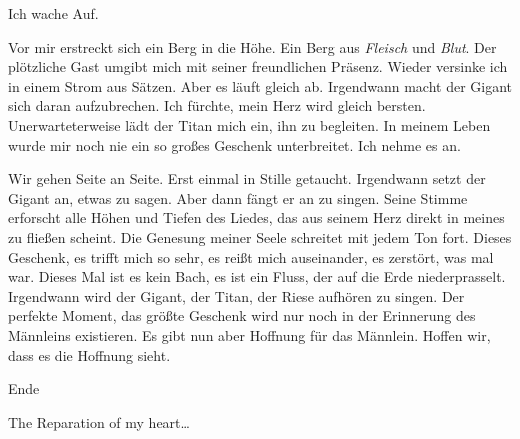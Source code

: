 \documentclass{article}
\begin{document}
	Ich wache Auf.
	
	Vor mir erstreckt sich ein Berg in die Höhe. Ein Berg aus \textit{Fleisch} und \textit{Blut}. Der plötzliche Gast umgibt mich mit seiner freundlichen Präsenz. Wieder versinke ich in einem Strom aus Sätzen. Aber es läuft gleich ab. Irgendwann macht der Gigant sich daran aufzubrechen. Ich fürchte, mein Herz wird gleich bersten. Unerwarteterweise lädt der Titan mich ein, ihn zu begleiten. In meinem Leben wurde mir noch nie ein so großes Geschenk unterbreitet. Ich nehme es an.  
	
	Wir gehen Seite an Seite. Erst einmal in Stille getaucht. Irgendwann setzt der Gigant an, etwas zu sagen. Aber dann fängt er an zu singen. Seine Stimme erforscht alle Höhen und Tiefen des Liedes, das aus seinem Herz direkt in meines zu fließen scheint. Die Genesung meiner Seele schreitet mit jedem Ton fort. Dieses Geschenk, es trifft mich so sehr, es reißt mich auseinander, es zerstört, was mal war. Dieses Mal ist es kein Bach, es ist ein Fluss, der auf die Erde niederprasselt. Irgendwann wird der Gigant, der Titan, der Riese aufhören zu singen. Der perfekte Moment, das größte Geschenk wird nur noch in der Erinnerung des Männleins existieren. Es gibt nun aber Hoffnung für das Männlein. Hoffen wir, dass es die Hoffnung sieht.
	
	Ende
	
	The Reparation of my heart\dots
\end{document}
